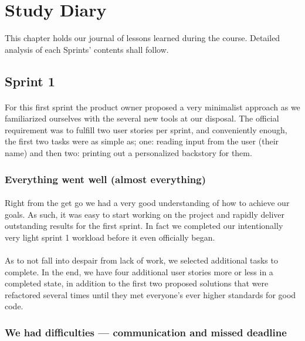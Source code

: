 \section{Study Diary}

This chapter holds our journal of lessons learned during the course. Detailed analysis of each Sprints' contents shall follow.

\subsection{Sprint 1}

\paragraph{} For this first sprint the product owner proposed a very minimalist approach as we familiarized ourselves with the several new tools at our disposal. The official requirement was to fulfill two user stories per sprint, and conveniently enough, the first two tasks were as simple as; one: reading input from the user (their name) and then two: printing out a personalized backstory for them.

\subsubsection{Everything went well (almost everything)}

\paragraph{} Right from the get go we had a very good understanding of how to achieve our goals. As such, it was easy to start working on the project and rapidly deliver outstanding results for the first sprint. In fact we completed our intentionally very light sprint 1 workload before it even officially began.

\paragraph{} As to not fall into despair from lack of work, we selected additional tasks to complete. In the end, we have four additional user stories more or less in a completed state, in addition to the first two proposed solutions that were refactored several times until they met everyone's ever higher standards for good code.

\subsubsection{We had difficulties — communication and missed deadline}

